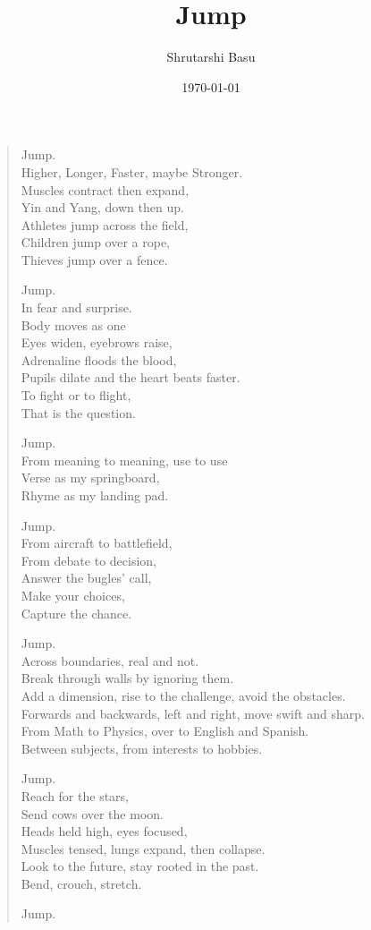 \documentclass[11pt,letterpaper]{article}
\title{Jump}
\author{Shrutarshi Basu}
\date{\today}
\begin{document}
\maketitle
\begin{verse}

Jump. \\
Higher, Longer, Faster, maybe Stronger. \\
Muscles contract then expand, \\
Yin and Yang, down then up. \\
Athletes jump across the field, \\
Children jump over a rope, \\
Thieves jump over a fence. 

Jump. \\
In fear and surprise.\\
Body moves as one \\
Eyes widen, eyebrows raise, \\
Adrenaline floods the blood, \\
Pupils dilate and the heart beats faster. \\
To fight or to flight, \\
That is the question.

Jump.\\
From meaning to meaning, use to use\\
Verse as my springboard,\\
Rhyme as my landing pad.

Jump.\\
From aircraft to battlefield,\\
From debate to decision,\\
Answer the bugles' call,\\
Make your choices,\\
Capture the chance.

Jump.\\
Across boundaries, real and not.\\
Break through walls by ignoring them.\\
Add a dimension, rise to the challenge, avoid the obstacles.\\
Forwards and backwards, left and right, move swift and sharp.\\
From Math to Physics, over to English and Spanish.\\
Between subjects, from interests to hobbies.

Jump.\\
Reach for the stars,\\
Send cows over the moon.\\
Heads held high, eyes focused,\\
Muscles tensed, lungs expand, then collapse.\\
Look to the future, stay rooted in the past.\\
Bend, crouch, stretch. 

Jump.\\
\end{verse}
\end{document}
